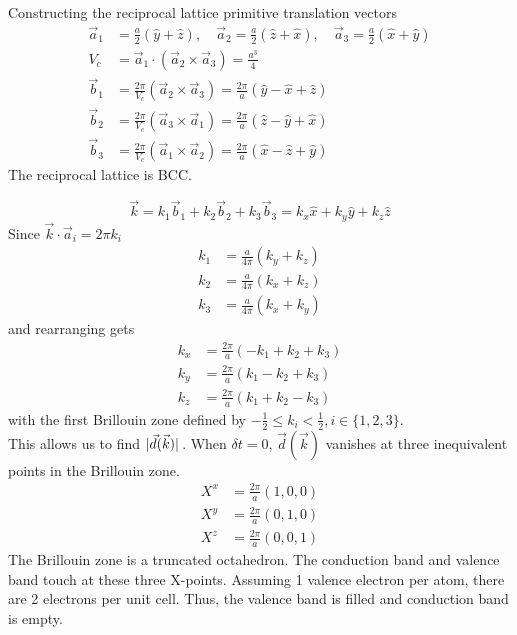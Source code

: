 \documentclass[12pt,a4paper,titlepage]{article}
\begin{document}
Constructing the reciprocal lattice primitive translation vectors
\begin{equation}
\begin{aligned}
\vec{a}_{1}&=\frac{a}{2}(\hat{y}+\hat{z}),\quad\vec{a}_{2}=\frac{a}{2}(\hat{z}+\hat{x}),\quad\vec{a}_{3}=\frac{a}{2}(\hat{x}+\hat{y})\\
V_{c}&=\vec{a}_{1}\cdot(\vec{a}_{2}\times\vec{a}_{3})=\frac{a^{3}}{4}\\
\vec{b}_{1}&=\frac{2\pi}{V_{c}}(\vec{a}_{2}\times\vec{a}_{3})=\frac{2\pi}{a}(\hat{y}-\hat{x}+\hat{z})\\
\vec{b}_{2}&=\frac{2\pi}{V_{c}}(\vec{a}_{3}\times\vec{a}_{1})=\frac{2\pi}{a}(\hat{z}-\hat{y}+\hat{x})\\
\vec{b}_{3}&=\frac{2\pi}{V_{c}}(\vec{a}_{1}\times\vec{a}_{2})=\frac{2\pi}{a}(\hat{x}-\hat{z}+\hat{y})
\end{aligned}
\end{equation}
The reciprocal lattice is BCC.

\begin{equation}
\vec{k}=k_{1}\vec{b}_{1}+k_{2}\vec{b}_{2}+k_{3}\vec{b}_{3}=k_{x}\hat{x}+k_{y}\hat{y}+k_{z}\hat{z}
\end{equation}
Since $\vec{k}\cdot\vec{a}_{i}=2\pi k_{i}$
\begin{equation}
\begin{aligned}
k_{1}&=\frac{a}{4\pi}(k_{y}+k_{z})\\
k_{2}&=\frac{a}{4\pi}(k_{x}+k_{z})\\
k_{3}&=\frac{a}{4\pi}(k_{x}+k_{y})
\end{aligned}
\end{equation}
and rearranging gets
\begin{equation}
\begin{aligned}
k_{x}&=\frac{2\pi}{a}(-k_{1}+k_{2}+k_{3})\\
k_{y}&=\frac{2\pi}{a}(k_{1}-k_{2}+k_{3})\\
k_{z}&=\frac{2\pi}{a}(k_{1}+k_{2}-k_{3})
\end{aligned}
\end{equation}
with the first Brillouin zone defined by $-\frac{1}{2}\leq k_{i}<\frac{1}{2}, i\in\{1,2,3\}$.\\

This allows us to find $\abs*{\vec{d}(\vec{k})}$. When $\delta t=0$, $\vec{d}(\vec{k})$ vanishes at three inequivalent points in the Brillouin zone.
\begin{equation}
\begin{aligned}
X^{x}&=\frac{2\pi}{a}(1,0,0)\\
X^{y}&=\frac{2\pi}{a}(0,1,0)\\
X^{z}&=\frac{2\pi}{a}(0,0,1)
\end{aligned}
\end{equation}
The Brillouin zone is a truncated octahedron. The conduction band and valence band touch at these three X-points. Assuming 1 valence electron per atom, there are 2 electrons per unit cell. Thus, the valence band is filled and conduction band is empty.\\
\end{document}
